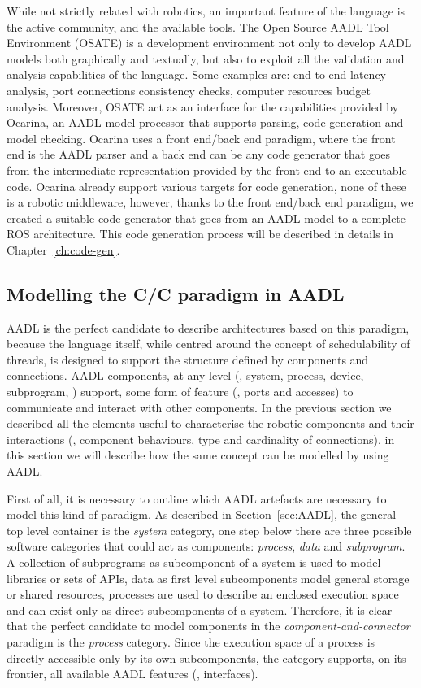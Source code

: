While not strictly related with robotics, an important feature of the language is the active community, and the available tools. The Open Source AADL Tool Environment (OSATE) is a development environment not only to develop AADL models both graphically and textually, but also to exploit all the validation and analysis capabilities of the language. Some examples are: end-to-end latency analysis, port connections consistency checks, computer resources budget analysis. Moreover, OSATE act as an interface for the capabilities provided by Ocarina, an AADL model processor that supports parsing, code generation and model checking. Ocarina uses a front end/back end paradigm, where the front end is the AADL parser and a back end can be any code generator that goes from the intermediate representation provided by the front end to an executable code. Ocarina already support various targets for code generation, none of these is a robotic middleware, however, thanks to the front end/back end paradigm, we created a suitable code generator that goes from an AADL model to a complete ROS architecture. This code generation process will be described in details in Chapter~\ref{ch:code-gen}.

\subsection{Modelling the C/C paradigm in AADL}
\label{sec:aadl-cnc}
AADL is the perfect candidate to describe architectures based on this paradigm, because the language itself, while centred around the concept of schedulability of threads, is designed to support the structure defined by components and connections. AADL components, at any level (\eg, system, process, device, subprogram, \etc) support, some form of feature (\ie, ports and accesses) to communicate and interact with other components. In the previous section we described all the elements useful to characterise the robotic components and their interactions (\ie, component behaviours, type and cardinality of connections), in this section we will describe how the same concept can be modelled by using AADL.

First of all, it is necessary to outline which AADL artefacts are necessary to model this kind of paradigm. As described in Section~\ref{sec:AADL}, the general top level container is the \textit{system} category, one step below there are three possible software categories that could act as components: \textit{process}, \textit{data} and \textit{subprogram}. A collection of subprograms as subcomponent of a system is used to model libraries or sets of APIs, data as first level subcomponents model general storage or shared resources, processes are used to describe an enclosed execution space and can exist only as direct subcomponents of a system. Therefore, it is clear that the perfect candidate to model components in the \textit{component-and-connector} paradigm is the \textit{process} category. Since the execution space of a process is directly accessible only by its own subcomponents, the category supports, on its frontier, all available AADL features (\ie, interfaces). 

